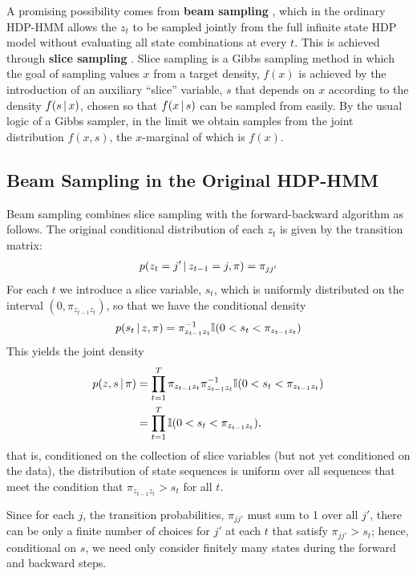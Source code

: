 A promising possibility comes from {\bf beam sampling} \cite{vangael2008beam}, which 
in the ordinary HDP-HMM allows the $z_t$ to be sampled jointly
from the full infinite state HDP model without evaluating all state combinations at every $t$.
This is achieved through {\bf slice sampling} \cite{neal2003slice}.  Slice sampling is a Gibbs
sampling method in which the goal of sampling values $x$ from a target
density, $f(x)$ is achieved by the introduction of an auxiliary
``slice'' variable, $s$ that depends on $x$ according to the density 
$f(s \, \vert \, x)$, chosen so that $f(x \, \vert \, s)$ can be sampled from
easily.  By the usual logic of a Gibbs sampler, in the limit we obtain
samples from the joint distribution $f(x,s)$, the $x$-marginal of
which is $f(x)$.

\subsection{Beam Sampling in the Original HDP-HMM}
\label{sec:beam-sampl-orig}

Beam sampling \citep{vangael2008beam} combines slice sampling with the
forward-backward algorithm as follows.  The original conditional
distribution of each $z_t$ is given by the transition matrix:
\begin{align}
  p(z_t = j' \, \vert \, z_{t-1} = j, \pi) = \pi_{jj'}
\end{align}
For each $t$ we introduce a slice variable, $s_t$, which is uniformly
distributed on the interval $(0, \pi_{z_{t-1}z_t})$, so that we have
the conditional density
\begin{align}
  p(s_t \, \vert \, z, \pi) = \pi_{z_{t-1}z_t}^{-1} \mathbb{I}(0 < s_t < \pi_{z_{t-1}z_t})
\end{align}
This yields the joint density
\begin{align}
  p(z, s \, \vert \, \pi) &= \prod_{t=1}^T \pi_{z_{t-1}z_t}
  \pi_{z_{t-1}z_t}^{-1} \mathbb{I}(0 < s_t < \pi_{z_{t-1}z_t})\\
  &= \prod_{t=1}^T \mathbb{I}(0 < s_t < \pi_{z_{t-1}z_t}),
\end{align}
that is, conditioned on the collection of slice variables (but not yet
conditioned on the data), the distribution of state sequences is
uniform over all sequences that meet the condition that
$\pi_{z_{t-1}z_t} > s_t$ for all $t$.

Since for each $j$, the transition probabilities, $\pi_{jj'}$ must sum
to 1 over all $j'$, there can be only a finite number of choices for
$j'$ at each $t$ that satisfy $\pi_{jj'} > s_t$; hence, conditional on
$s$, we need only consider finitely many states during the forward and
backward steps.

